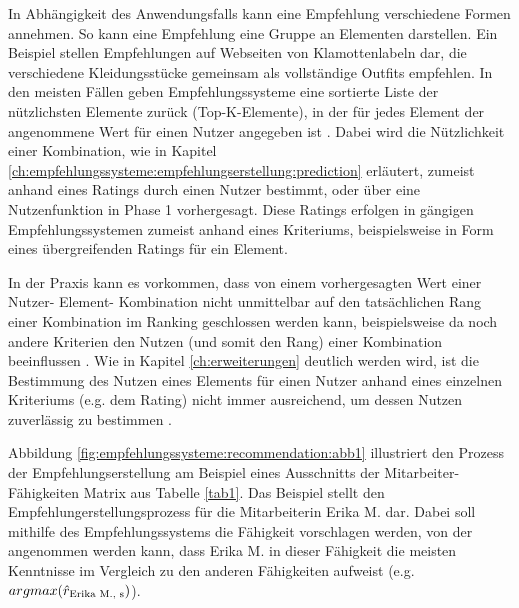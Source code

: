 In Abhängigkeit des Anwendungsfalls kann eine Empfehlung verschiedene Formen annehmen.
So kann eine Empfehlung eine Gruppe an Elementen darstellen.
Ein Beispiel stellen Empfehlungen auf Webseiten von Klamottenlabeln dar, die verschiedene Kleidungsstücke gemeinsam als vollständige Outfits empfehlen.
In den meisten Fällen geben Empfehlungssysteme eine sortierte Liste der nützlichsten Elemente zurück (Top-K-Elemente), in der für jedes Element der angenommene Wert für einen Nutzer angegeben ist \cite[S. 6]{ricci:book}\cite[S. 3]{recommenderSystems:2016}.
Dabei wird die Nützlichkeit einer Kombination, wie in Kapitel \ref{ch:empfehlungssysteme:empfehlungserstellung:prediction} erläutert, zumeist anhand eines Ratings durch einen Nutzer bestimmt, oder über eine Nutzenfunktion in Phase 1 vorhergesagt.
Diese Ratings erfolgen in gängigen Empfehlungssystemen zumeist anhand eines Kriteriums, beispielsweise in Form eines übergreifenden Ratings für ein Element.

In der Praxis kann es vorkommen, dass von einem vorhergesagten Wert einer Nutzer- Element- Kombination nicht unmittelbar auf den tatsächlichen Rang einer Kombination im Ranking geschlossen werden kann, beispielsweise da noch andere Kriterien den Nutzen (und somit den Rang) einer Kombination beeinflussen \cite[S. 405]{unternährer:article}.
Wie in Kapitel \ref{ch:erweiterungen} deutlich werden wird, ist die Bestimmung des Nutzen eines Elements für einen Nutzer anhand eines einzelnen Kriteriums (e.g. dem Rating) nicht immer ausreichend, um dessen Nutzen zuverlässig zu bestimmen \cite[S. 847]{ricci:book}.

Abbildung \ref{fig:empfehlungssysteme:recommendation:abb1} illustriert den Prozess der Empfehlungserstellung am Beispiel eines Ausschnitts der Mitarbeiter-Fähigkeiten Matrix aus Tabelle \ref{tab1}.
Das Beispiel stellt den Empfehlungerstellungsprozess für die Mitarbeiterin Erika M. dar.
Dabei soll mithilfe des Empfehlungssystems die Fähigkeit vorschlagen werden, von der angenommen werden kann, dass Erika M. in dieser Fähigkeit die meisten Kenntnisse im Vergleich zu den anderen Fähigkeiten aufweist (e.g. $argmax(\hat{r}_{\textnormal{Erika M., s}})$).

